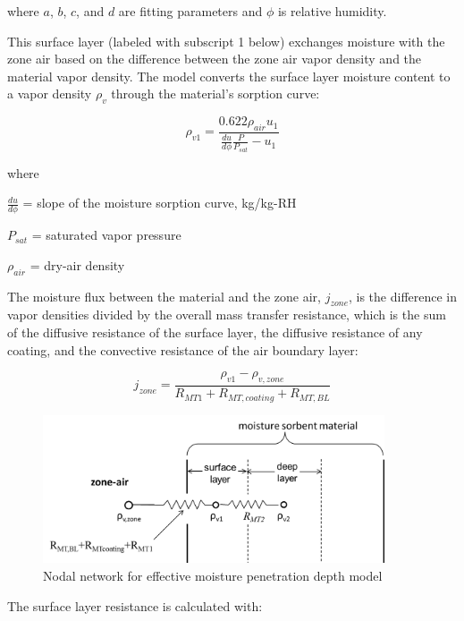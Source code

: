 where \(a\), \(b\), \(c\), and \(d\) are fitting parameters and \(\phi\) is relative humidity.

This surface layer (labeled with subscript 1 below) exchanges moisture with the zone air based on the difference between the zone air vapor density and the material vapor density. The model converts the surface layer moisture content to a vapor density \(\rho_v\) through the material's sorption curve:

\begin{equation}
\rho_{v1} = \frac {0.622 \rho_{air} u_{1}} {\frac{du}{d\phi} \frac{P}{P_{sat}} - u_{1}}
\end{equation}

where

\(\frac{du}{d\phi}\) = slope of the moisture sorption curve, kg/kg-RH

\(P_{sat}\) = saturated vapor pressure

\(\rho_{air}\) = dry-air density

The moisture flux between the material and the zone air, \(j_{zone}\), is the difference in vapor densities divided by the overall mass transfer resistance, which is the sum of the diffusive resistance of the surface layer, the diffusive resistance of any coating, and the convective resistance of the air boundary layer:

\begin{equation}
j_{zone} = \frac{\rho_{v1} - \rho_{v,zone}}{R_{MT1} + R_{MT,coating} + R_{MT,BL}}
\end{equation}

\begin{figure}[hbtp]
\centering
\includegraphics[width=0.9\textwidth, height=0.9\textheight, keepaspectratio=true]{media/EMPDschematic.png}
\caption{Nodal network for effective moisture penetration depth model \protect \label{fig:Nodal-network-for-effective-moisture-penetration-depth-model}}
\end{figure}

The surface layer resistance is calculated with:

